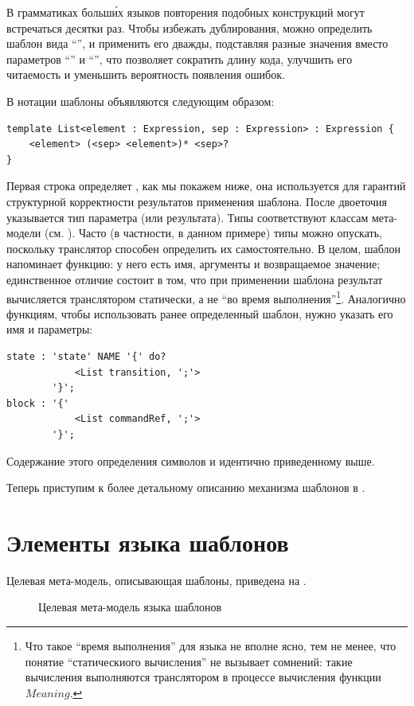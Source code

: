 В грамматиках больш\'{и}х языков повторения подобных конструкций могут встречаться десятки раз. Чтобы избежать дублирования, можно определить шаблон вида ``'', и применить его дважды, подставляя разные значения вместо параметров ``'' и ``'', что позволяет сократить длину кода, улучшить его читаемость и уменьшить вероятность появления ошибок.

В нотации  шаблоны объявляются следующим образом:
\begin{lstlisting}
template List<element : Expression, sep : Expression> : Expression {
	<element> (<sep> <element>)* <sep>?
}
\end{lstlisting}
Первая строка определяет , как мы покажем ниже, она используется для гарантий структурной корректности результатов применения шаблона. После двоеточия указывается тип параметра (или результата). Типы соответствуют классам мета-модели  (см. ). Часто (в частности, в данном примере) типы можно опускать, поскольку транслятор способен определить их самостоятельно. В целом, шаблон напоминает функцию: у него есть имя, аргументы и возвращаемое значение; единственное отличие состоит в том, что при применении шаблона результат вычисляется транслятором статически, а не ``во время выполнения''\footnote{Что такое ``время выполнения'' для языка  не вполне ясно, тем не менее, что понятие ``статическиого вычисления'' не вызывает сомнений: такие вычисления выполняются транслятором в процессе вычисления функции $Meaning$.}. Аналогично функциям, чтобы использовать ранее определенный шаблон, нужно указать его имя и параметры:
\begin{lstlisting}
state : 'state' NAME '{' do? 
			<List transition, ';'>
		'}';
block : '{' 
			<List commandRef, ';'>
		'}';
\end{lstlisting}
Содержание этого определения символов  и  идентично приведенному выше.

Теперь приступим к более детальному описанию механизма шаблонов в .

\section{Элементы языка шаблонов}
Целевая мета-модель, описывающая шаблоны, приведена на .

\begin{figure}[htbp]
	\centering
	\caption{Целевая мета-модель языка шаблонов}\label{TempMM}
\end{figure}

